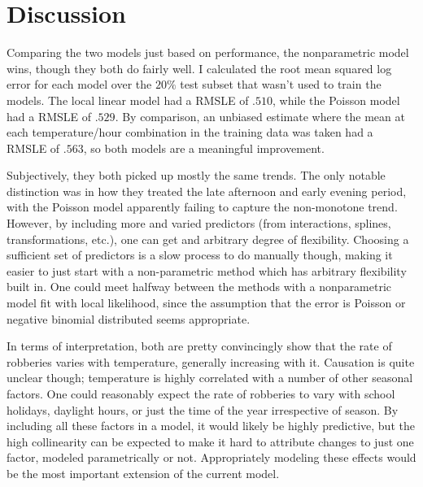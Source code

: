 \documentclass[11pt]{article}
\theoremstyle{definition}
\begin{document}
\section{Discussion} 
Comparing the two models just based on performance, the nonparametric model wins, though they both do fairly well. I calculated the root mean squared log error for each model over the $20\%$ test subset that wasn't used to train the models. The local linear model had a RMSLE of $.510$, while the Poisson model had a RMSLE of $.529$. By comparison, an unbiased estimate where the mean at each temperature/hour combination in the training data was taken had a RMSLE of $.563$, so both models are a meaningful improvement. \par
Subjectively, they both picked up mostly the same trends. The only notable distinction was in how they treated the late afternoon and early evening period, with the Poisson model apparently failing to capture the non-monotone trend. However, by including more and varied predictors (from interactions, splines, transformations, etc.), one can get and arbitrary degree of flexibility. Choosing a sufficient set of predictors is a slow process to do manually though, making it easier to just start with a non-parametric method which has arbitrary flexibility built in. One could meet halfway between the methods with a nonparametric model fit with local likelihood, since the assumption that the error is Poisson or negative binomial distributed seems appropriate. \par
In terms of interpretation, both are pretty convincingly show that the rate of robberies varies with temperature, generally increasing with it. Causation is quite unclear though; temperature is highly correlated with a number of other seasonal factors. One could reasonably expect the rate of robberies to vary with school holidays, daylight hours, or just the time of the year irrespective of season. By including all these factors in a model, it would likely be highly predictive, but the high collinearity can be expected to make it hard to attribute changes to just one factor, modeled parametrically or not. Appropriately modeling these effects would be the most important extension of the current model. \par
\end{document}
